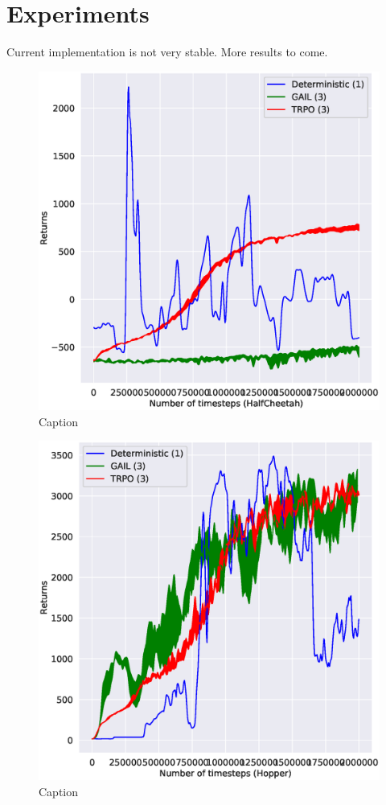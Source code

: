 \section{Experiments}
Current implementation is not very stable. More results to come. 

\begin{figure}
    \centering
    \includegraphics[width=.5\linewidth]{figures/HalfCheetah-2000000.eps}
    \caption{Caption}
    \label{fig:my_label}
\end{figure}

\begin{figure}
    \centering
    \includegraphics[width=.5\linewidth]{figures/Hopper-2000000.eps}
    \caption{Caption}
    \label{fig:my_label}
\end{figure}
